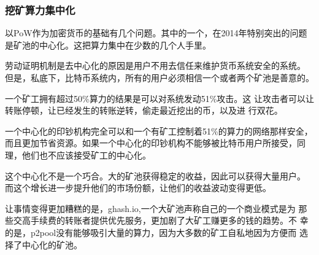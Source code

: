 \documentclass[letterpaper]{article}
\begin{document}
\subsubsection{挖矿算力集中化}
以PoW作为加密货币的基础有几个问题。其中的一个，在2014年特别突出的问题
是矿池的中心化。这把算力集中在少数的几个人手里。

劳动证明机制是去中心化的原因是用户不用去信任来维护货币系统安全的系统。
但是，私底下，比特币系统内，所有的用户必须相信一个或者两个矿池是善意的。

一个矿工拥有超过50\%算力的结果是可以对系统发动51\%攻击\cite{51pct}。这
让攻击者可以让转账停顿，让已经发生的转账逆转，偷走最近挖出的币，以及进
行双花\cite{centralized}。

一个中心化的印钞机构完全可以和一个有矿工控制着51\%的算力的网络那样安全，
而且更加节省资源。如果一个中心化的印钞机构不能够被比特币用户所接受，同
理，他们也不应该接受矿工的中心化。


这个中心化不是一个巧合。大的矿池获得稳定的收益，因此可以获得大量用户。
而这个增长进一步提升他们的市场份额，让他们的收益波动变得更低。

让事情变得更加糟糕的是，ghash.io,一个大矿池声称自己的一个商业模式是为
那些交高手续费的转账者提供优先服务，更加剧了大矿工赚更多的钱的趋势。不
幸的是，p2pool没有能够吸引大量的算力，因为大多数的矿工自私地因为方便而
选择了中心化的矿池。
\end{document}
